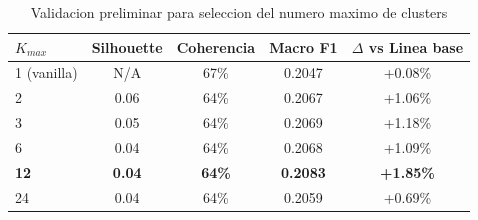 
\begin{table}[h]
\centering
\caption{Validacion preliminar para seleccion del numero maximo de clusters}
\label{tab:clustering_validation}
\begin{tabular}{lcccc}
\hline
$K_{max}$ & Silhouette & Coherencia & Macro F1 & $\Delta$ vs Linea base \\
\hline
1 (vanilla) & N/A & 67\% & 0.2047 & +0.08\% \\
2 & 0.06 & 64\% & 0.2067 & +1.06\% \\
3 & 0.05 & 64\% & 0.2069 & +1.18\% \\
6 & 0.04 & 64\% & 0.2068 & +1.09\% \\
\textbf{12} & \textbf{0.04} & \textbf{64\%} & \textbf{0.2083} & \textbf{+1.85\%} \\
24 & 0.04 & 64\% & 0.2059 & +0.69\% \\

\hline
\end{tabular}
\end{table}
